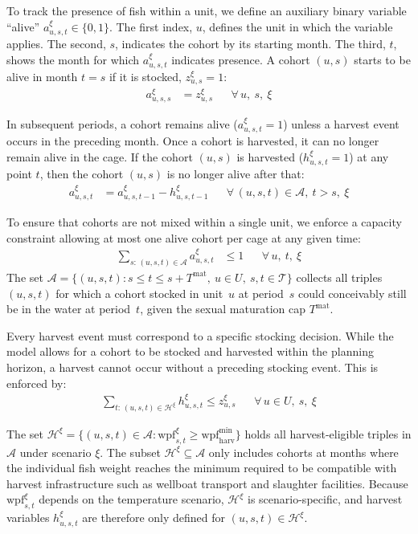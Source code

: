 \documentclass[12pt,a4paper]{article}
\begin{document}
To track the presence of fish within a unit, we define an auxiliary binary variable ``alive'' $a^\xi_{u,s,t} \in \{0,1\}$. The first index, $u$, defines the unit in which the variable applies. The second, $s$, indicates the cohort by its starting month. The third, $t$, shows the month for which $a^\xi_{u,s,t}$ indicates presence. A cohort $(u,s)$ starts to be alive in month $t = s$ if it is stocked, $z^\xi_{u,s} = 1$:
\begin{align}
  a^\xi_{u,s,s} &= z^\xi_{u,s} && \forall\, u,\ s,\ \xi
\end{align}
 
In subsequent periods, a cohort remains alive ($a^\xi_{u,s,t} = 1$) unless a harvest event occurs in the preceding month. Once a cohort is harvested, it can no longer remain alive in the cage. If the cohort $(u,s)$ is harvested ($h^\xi_{u,s,t} = 1$) at any point $t$, then the cohort $(u,s)$ is no longer alive after that:
\begin{align}
  a^\xi_{u,s,t} &= a^\xi_{u,s,t-1} - h^\xi_{u,s,t-1} && \forall\,(u,s,t)\in \mathcal{A},\ t>s,\ \xi
\end{align}
 
To ensure that cohorts are not mixed within a single unit, we enforce a capacity constraint allowing at most one alive cohort per cage at any given time:
\begin{align}
  \sum_{s:\,(u,s,t)\in \mathcal{A}} a^\xi_{u,s,t} &\leq 1 \label{eq:C4b} && \forall\, u, \ t,\ \xi
\end{align}
The set $\mathcal{A} = \{(u,s,t) : s \leq t \leq s + T^{\mathrm{mat}},\ u \in U,\ s,t \in \mathcal{T}\}$ collects all triples $(u,s,t)$ for which a cohort stocked in unit~$u$ at period~$s$ could conceivably still be in the water at period~$t$, given the sexual maturation cap $T^{\mathrm{mat}}$.
 
Every harvest event must correspond to a specific stocking decision. While the model allows for a cohort to be stocked and harvested within the planning horizon, a harvest cannot occur without a preceding stocking event. This is enforced by:
\begin{align}
  \sum_{t:\,(u,s,t)\in \mathcal{H}^\xi} h^\xi_{u,s,t} \leq z^\xi_{u,s} && \forall\, u\in U,\ s,\ \xi
\end{align}
 
The set $\mathcal{H}^\xi = \{(u,s,t) \in \mathcal{A} : \mathrm{wpf}^\xi_{s,t} \geq \mathrm{wpf}^{\min}_{\mathrm{harv}}\}$ holds all harvest-eligible triples in $\mathcal{A}$ under scenario $\xi$. The subset $\mathcal{H}^\xi \subseteq \mathcal{A}$ only includes cohorts at months where the individual fish weight reaches the minimum required to be compatible with harvest infrastructure such as wellboat transport and slaughter facilities. Because $\mathrm{wpf}^\xi_{s,t}$ depends on the temperature scenario, $\mathcal{H}^\xi$ is scenario-specific, and harvest variables $h^\xi_{u,s,t}$ are therefore only defined for $(u,s,t) \in \mathcal{H}^\xi$.
 
\end{document}
